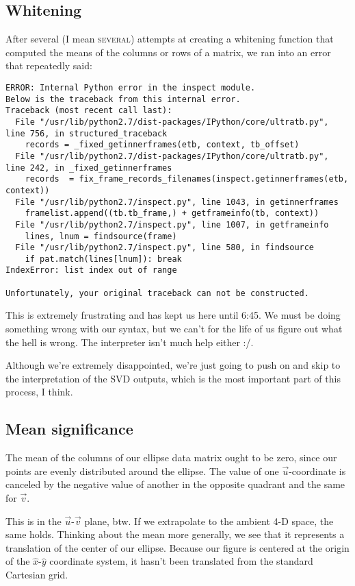 \documentclass{article}
\begin{document}
\subsection{Whitening}
\label{whitening}
After several (I mean \textsc{several}) attempts at creating a
whitening function that computed the means of the columns or rows of a
matrix, we ran into an error that repeatedly said:
\begin{verbatim}
ERROR: Internal Python error in the inspect module.
Below is the traceback from this internal error.
Traceback (most recent call last):
  File "/usr/lib/python2.7/dist-packages/IPython/core/ultratb.py",
line 756, in structured_traceback
    records = _fixed_getinnerframes(etb, context, tb_offset)
  File "/usr/lib/python2.7/dist-packages/IPython/core/ultratb.py",
line 242, in _fixed_getinnerframes
    records  = fix_frame_records_filenames(inspect.getinnerframes(etb,
context))
  File "/usr/lib/python2.7/inspect.py", line 1043, in getinnerframes
    framelist.append((tb.tb_frame,) + getframeinfo(tb, context))
  File "/usr/lib/python2.7/inspect.py", line 1007, in getframeinfo
    lines, lnum = findsource(frame)
  File "/usr/lib/python2.7/inspect.py", line 580, in findsource
    if pat.match(lines[lnum]): break
IndexError: list index out of range

Unfortunately, your original traceback can not be constructed.
\end{verbatim}

This is extremely frustrating and has kept us here until 6:45. We must
be doing something wrong with our syntax, but we can't for the life of
us figure out what the hell is wrong.  The interpreter isn't much help
either :/.

Although we're extremely disappointed, we're just going to push on and
skip to the interpretation of the SVD outputs, which is the most
important part of this process, I think.

\subsection{Mean significance}
\label{mean}

The mean of the columns of our ellipse data matrix ought to be zero,
since our points are evenly distributed around the ellipse.  The value of one
$\vec{u}$-coordinate is canceled by the negative value of another in
the opposite quadrant and the same for $\vec{v}$.

This is in the $\vec{u}$-$\vec{v}$ plane, btw.  If we extrapolate to
the ambient 4-D space, the same holds.  Thinking about the mean more
generally, we see that it represents a translation of the center of
our ellipse.  Because our figure is centered at the origin of the
$\hat{x}$-$\hat{y}$ coordinate system, it hasn't been translated from
the standard Cartesian grid.
\end{document}
